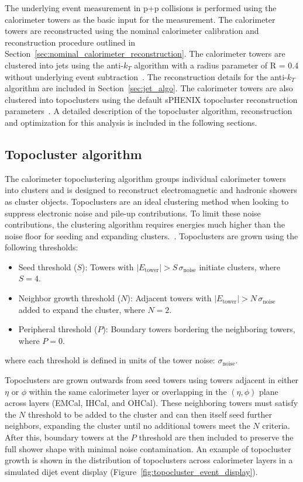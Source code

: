 The underlying event measurement in p+p collisions is performed using the calorimeter towers as the basic input for the measurement.
The calorimeter towers are reconstructed using the nominal calorimeter calibration and reconstruction procedure outlined in Section~\ref{sec:nominal_calorimeter_reconstruction}.
The calorimeter towers are clustered into jets using the anti-$k_{T}$ algorithm with a radius parameter of R = 0.4 without underlying event subtraction~\cite{jetreco_macro}. 
The reconstruction details for the anti-$k_{T}$ algorithm are included in Section~\ref{sec:jet_algo}.
The calorimeter towers are also clustered into topoclusters using the default sPHENIX topocluster reconstruction parameters~\cite{topo_macro}.
A detailed description of the topocluster algorithm, reconstruction and optimization for this analysis is included in the following sections.

\subsection{Topocluster algorithm}

The calorimeter topoclustering algorithm groups individual calorimeter towers into clusters and is designed to reconstruct electromagnetic and hadronic showers as cluster objects.
Topoclusters are an ideal clustering method when looking to suppress electronic noise and pile-up contributions. 
To limit these noise contributions, the clustering algorithm requires energies much higher than the noise floor for seeding and expanding clusters.~\cite{ATLAS:2017_topological_cluster_performance,ATLAS:2024_topological_cluster_timing}. 
Topoclusters are grown using the following thresholds:
\begin{itemize}
    \item Seed threshold ($S$): Towers with $|E_{\mathrm{tower}}| > S\,\sigma_{\mathrm{noise}}$ initiate clusters, where $S=4$.
    \item Neighbor growth threshold ($N$): Adjacent towers with $|E_{\mathrm{tower}}| > N\,\sigma_{\mathrm{noise}}$ added to expand the cluster, where $N=2$.
    \item Peripheral threshold ($P$): Boundary towers bordering the neighboring towers, where $P=0$.
\end{itemize}
where each threshold is defined in units of the tower noise: $\sigma_{\mathrm{noise}}$.

Topoclusters are grown outwards from seed towers using towers adjacent in either $\eta$ or $\phi$ within the same calorimeter layer or overlapping in the $(\eta,\phi)$ plane across layers (EMCal, IHCal, and OHCal). These neighboring towers must satisfy the $N$ threshold to be added to the cluster and can then itself seed further neighbors, expanding the cluster until no additional towers meet the $N$ criteria. 
After this, boundary towers at the $P$ threshold are then included to preserve the full shower shape with minimal noise contamination.
An example of topocluster growth is shown in the distribution of topoclusters across calorimeter layers in a simulated dijet event display (Figure~\ref{fig:topocluster_event_display}). 

